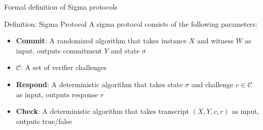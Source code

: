\documentclass[aspectratio=169, lualatex, handout]{beamer}
\begin{document}
\begin{frame}{Formal definition of Sigma protocols}
	\begin{block}{Definition: Sigma Protocol}
		A sigma protocol consists of the following parameters:
		\begin{itemize}
			\item \textbf{Commit}: A randomized algorithm that takes instance $X$ and witness $W$ as input, outputs commitment $Y$ and state $\sigma$
			\item $\mathcal{C}$: A set of verifier challenges
			\item \textbf{Respond}: A deterministic algorithm that takes state $\sigma$ and challenge $c \in \mathcal{C}$ as input, outputs response $r$
			\item \textbf{Check}: A deterministic algorithm that takes transcript $(X, Y, c, r)$ as input, outputs true/false
		\end{itemize}
	\end{block}
\end{frame}
\end{document}
